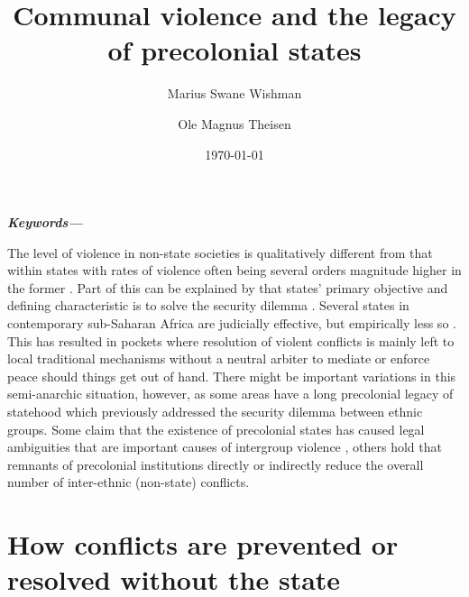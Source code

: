 \documentclass[12pt]{article}
\title{Communal violence and the legacy of precolonial states}
\author[$\dagger$]{Marius Swane Wishman}
\author[$\ddagger$]{Ole Magnus Theisen}
\affil[$\dagger$]{Department of Sociology and Political Science, NTNU}
\affil[$\ddagger$]{Independent PhD researcher}
\date{\today}
\providecommand{\keywords}[1]
{
	\small	
	\textbf{\textit{Keywords---}} #1
}
\begin{document}
\maketitle

\begin{abstract}
\end{abstract}

\keywords{}

\pagebreak

\onehalfspacing

The level of violence in non-state societies is qualitatively different from
that within states with rates of violence often being several orders magnitude
higher in the former \citep{diamond2013world, LeBlanc2003, Pinker2012}. Part of
this can be explained by that states’ primary objective and defining
characteristic is to solve the security dilemma \citep{Hobbes, Lake_1996}.
Several states in contemporary sub-Saharan Africa are judicially effective, but
empirically less so \citep{Jackson_1982}. This has resulted in pockets where
resolution of violent conflicts is mainly left to local traditional mechanisms
without a neutral arbiter to mediate or enforce peace should things get out of
hand. There might be important variations in this semi-anarchic situation,
however, as some areas have a long precolonial legacy of statehood which
previously addressed the security dilemma between ethnic groups. Some claim that
the existence of precolonial states has caused legal ambiguities that are
important causes of intergroup violence \citep{Eck2014}, others hold that
remnants of precolonial institutions directly \citep{Herbst2014, Wig2018} or
indirectly reduce the overall number of inter-ethnic (non-state) conflicts. 

\section{How conflicts are prevented or resolved without the state}
\end{document}
